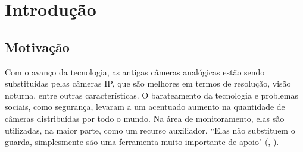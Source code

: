 \documentclass[]{politex}
\begin{document}






%
%


%
%


\listadefiguras
\listadetabelas



\sumario




	
\chapter{Introdução}
\section{Motivação}
Com o avanço da tecnologia, as antigas câmeras analógicas estão sendo substituídas pelas câmeras IP, que são melhores em termos de resolução, visão noturna, entre outras características. O barateamento da tecnologia e problemas sociais, como segurança, levaram a um acentuado aumento na quantidade de câmeras distribuídas por todo o mundo. Na área de monitoramento, elas são utilizadas, na maior parte, como um recurso auxiliador.  “Elas não substituem o guarda, simplesmente são uma ferramenta muito importante de apoio" (, \citeyear{bermudez}).
\end{document}
